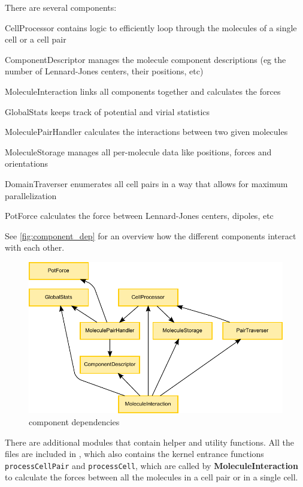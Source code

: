 There are several components:
\begin{compactdesc}
\item[CellProcessor] contains logic to efficiently loop through the molecules of a single cell or a cell pair
\item[ComponentDescriptor] manages the molecule component descriptions (eg the number of Lennard-Jones centers, their positions, etc)
\item[MoleculeInteraction] links all components together and calculates the forces
\item[GlobalStats] keeps track of potential and virial statistics
\item[MoleculePairHandler] calculates the interactions between two given molecules
\item[MoleculeStorage] manages all per-molecule data like positions, forces and orientations
\item[DomainTraverser] enumerates all cell pairs in a way that allows for maximum parallelization
\item[PotForce] calculates the force between Lennard-Jones centers, dipoles, etc
\end{compactdesc}
See \autoref{fig:component_dep} for an overview how the different components interact with each other.

\begin{figure}
\centering
\includegraphics{figures/component_dependencies.pdf}
\caption{component dependencies}
\label{fig:component_dep}
\end{figure}

There are additional \cuda{} modules that contain helper and utility functions.
All the  files are included in , which also contains the kernel entrance functions \lstinline!processCellPair! and \lstinline!processCell!, which are called by \textbf{MoleculeInteraction} to calculate the forces between all the molecules in a cell pair or in a single cell.

